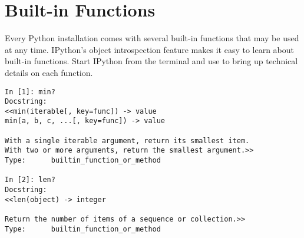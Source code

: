 \label{lab:Standard Library}


\section*{Built-in Functions}

Every Python installation comes with several built-in functions that may be used at any time.
IPython's object introspection feature makes it easy to learn about built-in functions.
Start IPython from the terminal and use  to bring up technical details on each function.

\begin{lstlisting}
In [1]: min?
Docstring:
<<min(iterable[, key=func]) -> value
min(a, b, c, ...[, key=func]) -> value

With a single iterable argument, return its smallest item.
With two or more arguments, return the smallest argument.>>
Type:      builtin_function_or_method

In [2]: len?
Docstring:
<<len(object) -> integer

Return the number of items of a sequence or collection.>>
Type:      builtin_function_or_method
\end{lstlisting}

